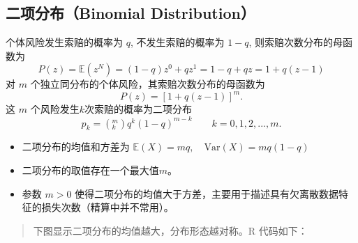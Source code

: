 \documentclass[
]{book}
\begin{document}
\hypertarget{ux4e8cux9879ux5206ux5e03binomial-distribution}{%
\subsection{二项分布（Binomial Distribution）}\label{ux4e8cux9879ux5206ux5e03binomial-distribution}}

个体风险发生索赔的概率为 \(q\), 不发生索赔的概率为 \(1-q\), 则索赔次数分布的母函数为 \[
P\left( z \right)=\mathbb{E}\left( {{z}^{N}} \right)=\left( 1-q \right){{z}^{0}}+q{{z}^{1}}=1-q+qz=1+q\left( z-1 \right)
\]
对 \(m\) 个独立同分布的个体风险，其索赔次数分布的母函数为
\[
P\left( z \right)=[1+q\left( z-1 \right)]^m.
\]
这 \(m\) 个风险发生\(k\)次索赔的概率为二项分布
\[
{{p}_{k}}=\left(^m 
_k 
\right){{q}^{k}}{{(1-q)}^{m-k}}\quad \quad k=0,1,2,...,m.
\]

\begin{itemize}
\item
  二项分布的均值和方差为 \(\mathbb{E}(X)=mq, \quad \text{Var}(X)=mq(1-q)\)
\item
  二项分布的取值存在一个最大值\(m\)。
\item
  参数 \(m>0\) 使得二项分布的均值大于方差，主要用于描述具有欠离散数据特征的损失次数（精算中并不常用）。
\end{itemize}

\begin{quote}
下图显示二项分布的均值越大，分布形态越对称。R 代码如下：
\end{quote}
\end{document}
